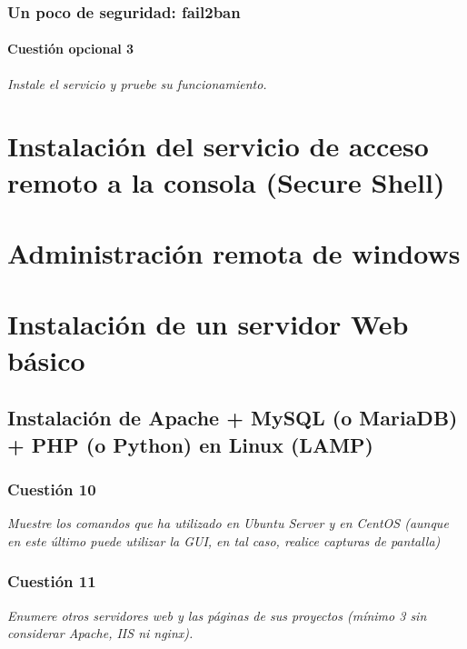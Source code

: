 \subsubsection{Un poco de seguridad: fail2ban}
\paragraph{Cuestión opcional 3}
\textit{Instale el servicio y pruebe su funcionamiento.}


\section{Instalación del servicio de acceso remoto a la consola (Secure Shell)}


\section{Administración remota de windows}


\section{Instalación de un servidor Web básico}

\subsection{Instalación de Apache + MySQL (o MariaDB) + PHP (o Python) en Linux (LAMP)}
\subsubsection{Cuestión 10}
\textit{Muestre los comandos que ha utilizado en Ubuntu Server y en CentOS (aunque en este último puede utilizar la GUI, en tal caso, realice capturas de pantalla)}

\subsubsection{Cuestión 11}
\textit{Enumere otros servidores web y las páginas de sus proyectos (mínimo 3 sin considerar Apache, IIS ni nginx).}


